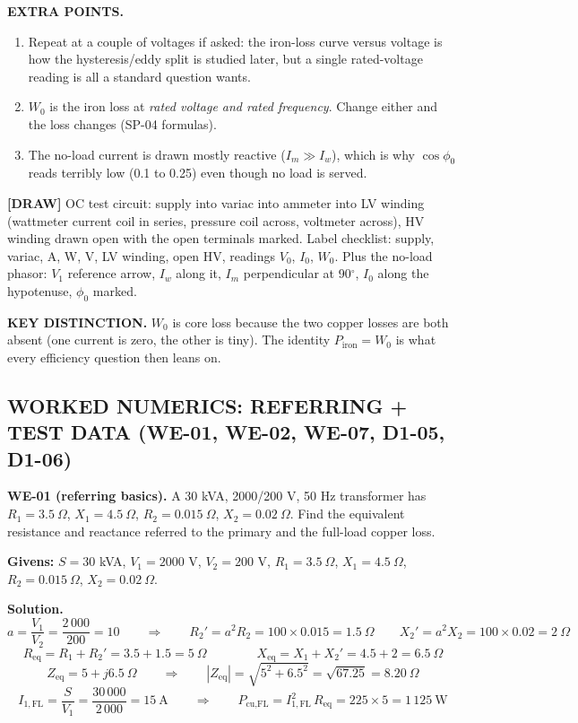 \documentclass[11pt]{article}
\newcommand{\tagline}[1]{\textbf{\color{copper}#1}}
\newcommand{\keydist}[1]{\vspace{2pt}\textbf{\color{red}KEY DISTINCTION.} #1}
\newcommand{\drawline}[1]{\textbf{\color{muted}[DRAW]} #1}
\begin{document}
\tagline{EXTRA POINTS.}
\begin{enumerate}[label=\arabic*.]
\item Repeat at a couple of voltages if asked: the iron-loss curve versus voltage is how the hysteresis/eddy split is studied later, but a single rated-voltage reading is all a standard question wants.
\item $W_0$ is the iron loss at \emph{rated voltage and rated frequency}. Change either and the loss changes (SP-04 formulas).
\item The no-load current is drawn mostly reactive ($I_m \gg I_w$), which is why $\cos\phi_0$ reads terribly low (0.1 to 0.25) even though no load is served.
\end{enumerate}

\drawline{OC test circuit: supply into variac into ammeter into LV winding (wattmeter current coil in series, pressure coil across, voltmeter across), HV winding drawn open with the open terminals marked. Label checklist: supply, variac, A, W, V, LV winding, open HV, readings $V_0$, $I_0$, $W_0$. Plus the no-load phasor: $V_1$ reference arrow, $I_w$ along it, $I_m$ perpendicular at 90$^\circ$, $I_0$ along the hypotenuse, $\phi_0$ marked.}

\keydist{$W_0$ is core loss because the two copper losses are both absent (one current is zero, the other is tiny). The identity $P_{\text{iron}} = W_0$ is what every efficiency question then leans on.}

\hrulefill
\subsection*{\color{copper}WORKED NUMERICS: REFERRING + TEST DATA (WE-01, WE-02, WE-07, D1-05, D1-06)}

\tagline{WE-01 (referring basics).} A 30 kVA, 2000/200 V, 50 Hz transformer has $R_1 = 3.5\ \Omega$, $X_1 = 4.5\ \Omega$, $R_2 = 0.015\ \Omega$, $X_2 = 0.02\ \Omega$. Find the equivalent resistance and reactance referred to the primary and the full-load copper loss.

\textbf{Givens:} $S = 30$ kVA, $V_1 = 2000$ V, $V_2 = 200$ V, $R_1 = 3.5\ \Omega$, $X_1 = 4.5\ \Omega$, $R_2 = 0.015\ \Omega$, $X_2 = 0.02\ \Omega$.

\textbf{Solution.}
\[
a = \frac{V_1}{V_2} = \frac{2\,000}{200} = 10
\qquad\Longrightarrow\qquad
R_2' = a^{2} R_2 = 100 \times 0.015 = 1.5\ \Omega
\qquad
X_2' = a^{2} X_2 = 100 \times 0.02 = 2\ \Omega
\]
\[
R_{\text{eq}} = R_1 + R_2' = 3.5 + 1.5 = 5\ \Omega
\qquad\qquad
X_{\text{eq}} = X_1 + X_2' = 4.5 + 2 = 6.5\ \Omega
\]
\[
Z_{\text{eq}} = 5 + j6.5\ \Omega
\qquad\Longrightarrow\qquad
\left|Z_{\text{eq}}\right| = \sqrt{5^{2} + 6.5^{2}} = \sqrt{67.25} = 8.20\ \Omega
\]
\[
I_{1,\text{FL}} = \frac{S}{V_1} = \frac{30\,000}{2\,000} = 15\ \text{A}
\qquad\Longrightarrow\qquad
P_{\text{cu,FL}} = I_{1,\text{FL}}^{2}\, R_{\text{eq}} = 225 \times 5 = 1\,125\ \text{W}
\]
\end{document}
